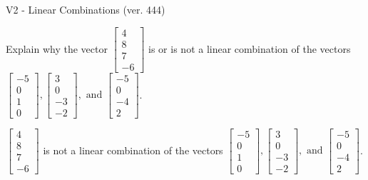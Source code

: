 \begin{exercise}
  \begin{exerciseTitle}V2 - Linear Combinations (ver. 444)\end{exerciseTitle}
  \begin{exerciseStatement}
    Explain why the vector \(\left[\begin{array}{c}
4 \\
8 \\
7 \\
-6
\end{array}\right]\)  is or is not a linear 
	combination of the vectors \(\left[\begin{array}{c}
-5 \\
0 \\
1 \\
0
\end{array}\right] , \left[\begin{array}{c}
3 \\
0 \\
-3 \\
-2
\end{array}\right] , \text{ and } \left[\begin{array}{c}
-5 \\
0 \\
-4 \\
2
\end{array}\right]\).
	


  \end{exerciseStatement}
  \begin{exerciseAnswer}
   \(\left[\begin{array}{c}
4 \\
8 \\
7 \\
-6
\end{array}\right]\) 
  	 is not  
	a linear combination of the vectors \(\left[\begin{array}{c}
-5 \\
0 \\
1 \\
0
\end{array}\right] , \left[\begin{array}{c}
3 \\
0 \\
-3 \\
-2
\end{array}\right] , \text{ and } \left[\begin{array}{c}
-5 \\
0 \\
-4 \\
2
\end{array}\right]\).

	
  


  \end{exerciseAnswer}
\end{exercise}